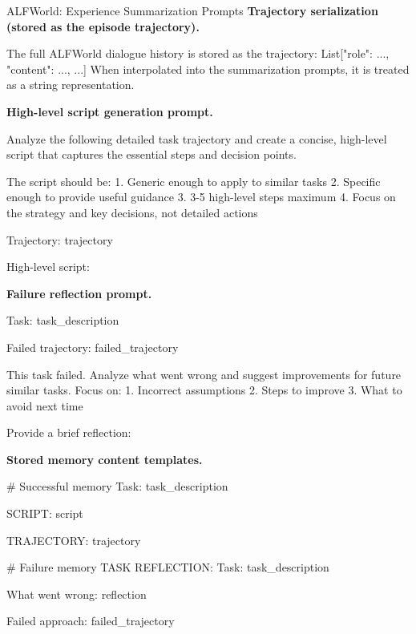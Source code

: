 \documentclass{article}
\theoremstyle{plain}
\theoremstyle{definition}
\theoremstyle{remark}
\begin{document}
\begin{PromptBox}{ALFWorld: Experience Summarization Prompts}
\textbf{Trajectory serialization (stored as the episode trajectory).}
\begin{PromptCode}
The full ALFWorld dialogue history is stored as the trajectory:
  List[{"role": ..., "content": ...}, ...]
When interpolated into the summarization prompts, it is treated as a string representation.
\end{PromptCode}
\medskip
\textbf{High-level script generation prompt.}
\begin{PromptCode}
Analyze the following detailed task trajectory and create a concise,
high-level script that captures the essential steps and decision points.

The script should be:
1. Generic enough to apply to similar tasks
2. Specific enough to provide useful guidance
3. 3-5 high-level steps maximum
4. Focus on the strategy and key decisions, not detailed actions

Trajectory:
{trajectory}

High-level script:
\end{PromptCode}
\medskip
\textbf{Failure reflection prompt.}
\begin{PromptCode}
Task: {task_description}

Failed trajectory:
{failed_trajectory}

This task failed. Analyze what went wrong and suggest improvements for future similar tasks.
Focus on:
1. Incorrect assumptions
2. Steps to improve
3. What to avoid next time

Provide a brief reflection:
\end{PromptCode}
\medskip
\textbf{Stored memory content templates.}
\begin{PromptCode}
# Successful memory
Task: {task_description}

SCRIPT:
{script}

TRAJECTORY:
{trajectory}

# Failure memory
TASK REFLECTION:
Task: {task_description}

What went wrong:
{reflection}

Failed approach:
{failed_trajectory}
\end{PromptCode}
\end{PromptBox}
\medskip
\end{document}
